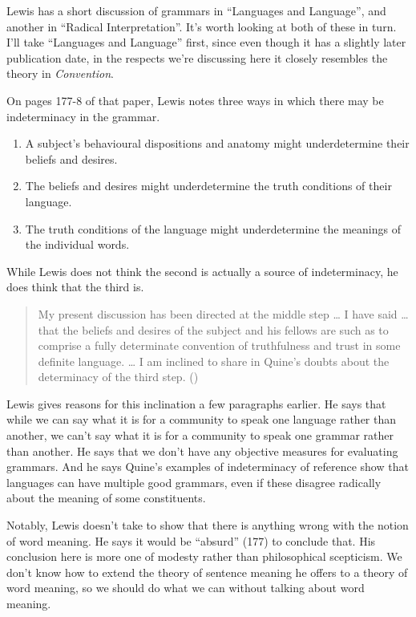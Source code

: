 \documentclass[
  10pt,
  letterpaper,
  DIV=11,
  numbers=noendperiod,
  twoside]{scrartcl}
\providecommand{\tightlist}{%
  \setlength{\itemsep}{0pt}\setlength{\parskip}{0pt}}\usepackage{longtable,booktabs,array}
\begin{document}
Lewis has a short discussion of grammars in ``Languages and Language'',
and another in ``Radical Interpretation''. It's worth looking at both of
these in turn. I'll take ``Languages and Language'' first, since even
though it has a slightly later publication date, in the respects we're
discussing here it closely resembles the theory in \emph{Convention}.

On pages 177-8 of that paper, Lewis notes three ways in which there may
be indeterminacy in the grammar.

\begin{enumerate}
\def\labelenumi{\arabic{enumi}.}
\tightlist
\item
  A subject's behavioural dispositions and anatomy might underdetermine
  their beliefs and desires.
\item
  The beliefs and desires might underdetermine the truth conditions of
  their language.
\item
  The truth conditions of the language might underdetermine the meanings
  of the individual words.
\end{enumerate}

While Lewis does not think the second is actually a source of
indeterminacy, he does think that the third is.

\begin{quote}
My present discussion has been directed at the middle step \ldots{} I
have said \ldots{} that the beliefs and desires of the subject and his
fellows are such as to comprise a fully determinate convention of
truthfulness and trust in some definite language. \ldots{} I am inclined
to share in Quine's doubts about the determinacy of the third step.
()
\end{quote}

Lewis gives reasons for this inclination a few paragraphs earlier. He
says that while we can say what it is for a community to speak one
language rather than another, we can't say what it is for a community to
speak one grammar rather than another. He says that we don't have any
objective measures for evaluating grammars. And he says Quine's examples
of indeterminacy of reference show that languages can have multiple good
grammars, even if these disagree radically about the meaning of some
constituents.

Notably, Lewis doesn't take to show that there is anything wrong with
the notion of word meaning. He says it would be ``absurd'' (177) to
conclude that. His conclusion here is more one of modesty rather than
philosophical scepticism. We don't know how to extend the theory of
sentence meaning he offers to a theory of word meaning, so we should do
what we can without talking about word meaning.
\end{document}
